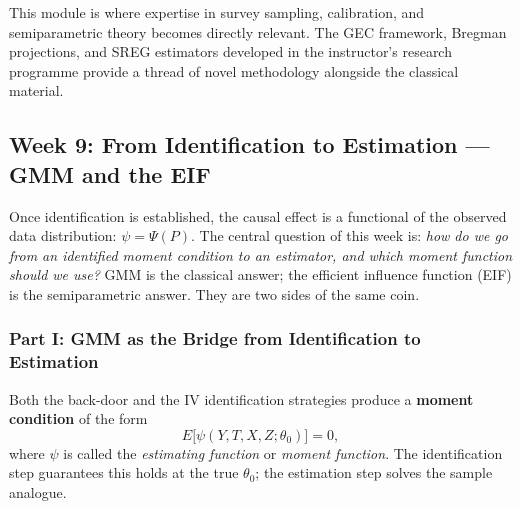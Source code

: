 \documentclass[12pt]{article}
\begin{document}
This module is where expertise in survey sampling, calibration, and
semiparametric theory becomes directly relevant.  The GEC framework,
Bregman projections, and SREG estimators developed in the instructor's
research programme provide a thread of novel methodology alongside the
classical material.

\subsection{Week 9: From Identification to Estimation ---
  GMM and the EIF}

Once identification is established, the causal effect is a functional
of the observed data distribution: $\psi = \Psi(P)$.  The central
question of this week is: \emph{how do we go from an identified moment
condition to an estimator, and which moment function should we use?}
GMM is the classical answer; the efficient influence function (EIF) is
the semiparametric answer.  They are two sides of the same coin.

\subsubsection*{Part I: GMM as the Bridge from Identification to
  Estimation}

Both the back-door and the IV identification strategies produce a
\textbf{moment condition} of the form
\[
  E\!\bigl[\psi(Y, T, X, Z;\theta_0)\bigr] = 0,
\]
where $\psi$ is called the \emph{estimating function} or \emph{moment
function}.  The identification step guarantees this holds at the true
$\theta_0$; the estimation step solves the sample analogue.
\end{document}
